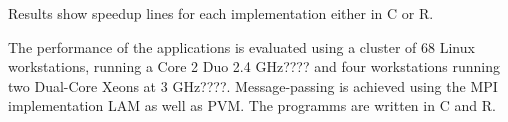 \documentclass{llncs}
\begin{document}

Results show speedup lines for each implementation either in C or R. 

The performance of the applications is evaluated using a cluster of 68
Linux workstations, running a Core 2 Duo 2.4 GHz???? and four workstations
running two Dual-Core Xeons at 3 GHz????. Message-passing is achieved using the MPI
implementation LAM as well as PVM. The programms are written in C and R. 


\end{document}
